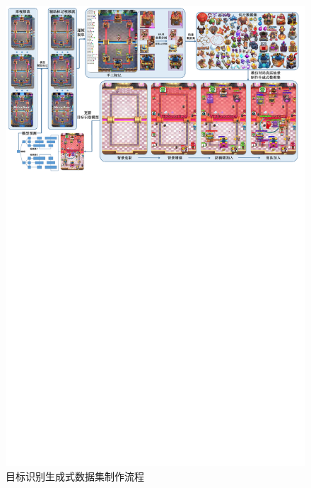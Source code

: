 \documentclass[openany,twoside,nofonts,AutoFakeBold,UTF8]{ctexbook}
\begin{document}
\begin{figure}[htbp]
  \centering
  \includegraphics[width=\textwidth]{detection dataset building.pdf}
  \caption{目标识别生成式数据集制作流程}\label{fig-generation-dataset}
\end{figure}
\end{document}
